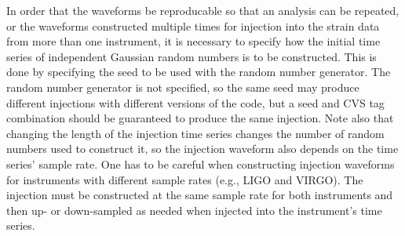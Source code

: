 \documentclass[10pt]{article}
\begin{document}
In order that the waveforms be reproducable so that an analysis can be
repeated, or the waveforms constructed multiple times for injection into
the strain data from more than one instrument, it is necessary to specify
how the initial time series of independent Gaussian random numbers is to be
constructed.  This is done by specifying the seed to be used with the
random number generator.  The random number generator is not specified, so
the same seed may produce different injections with different versions of
the code, but a seed and CVS tag combination should be guaranteed to
produce the same injection.  Note also that changing the length of the
injection time series changes the number of random numbers used to
construct it, so the injection waveform also depends on the time series'
sample rate.  One has to be careful when constructing injection waveforms
for instruments with different sample rates (e.g., LIGO and VIRGO).  The
injection must be constructed at the same sample rate for both instruments
and then up- or down-sampled as needed when injected into the instrument's
time series.
\end{document}
